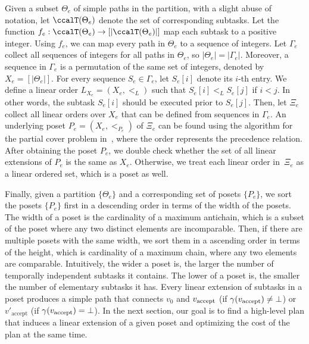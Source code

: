 \documentclass[Afour,sageh,times]{sagej}
\newcommand{\vertex}[1]{v_{\textup{#1}}}
\begin{document}
Given a subset $\Theta_e$ of simple paths in the partition, with a slight abuse of notation, let $\ccalT(\Theta_e)$ denote the set of corresponding  subtasks. Let the function $f_e:\ccalT(\Theta_e)\to [|\ccalT(\Theta_e)|]$ map each subtask to a positive integer. Using $f_e$, we can map every path in $\Theta_e$ to a sequence of integers. Let $\Gamma_e$ collect all sequences of integers for all paths in $\Theta_e$, so $|\Theta_e| =  |\Gamma_e|$. Moreover, a sequence in $\Gamma_e$ is a permutation of the same set of integers, denoted by $X_e = [|\Theta_e|]$. For every sequence $S_e \in \Gamma_e$, let $S_e[i]$ denote its $i$-th entry. We define a linear order $L_{X_e} = (X_e, <_L)$ such that  $S_e[i]  <_L  S_e[j] $ if $i  <  j$. In other words, the subtask $S_e[i]$ should be executed prior to  $S_e[j]$. Then, let $\Xi_e$ collect all linear orders over $X_e$ that can be defined from sequences in $\Gamma_e$. An underlying poset $P_e  = (X_e, <_{P_e})$ of $\Xi_e$ can be found using the algorithm for the partial cover problem in~\cite{heath2013poset}, where the order represents the precedence relation. After obtaining the poset $P_e$, we double check whether the set of all linear extensions of $P_e$ is the same as $X_e$. Otherwise, we treat each linear order in~$\Xi_e$ as a linear ordered set, which is a poset as well.

{Finally, given a partition $\{\Theta_e\}$ and a corresponding set of posets $\{P_e\}$, we sort the posets  $\{P_e\}$ first in a descending order in terms of the width of the posets. The width of a poset  is the cardinality of a maximum antichain, which is a subset of the poset where any two distinct elements are incomparable. Then, if there are multiple posets with the same width, we sort them in a ascending order in terms of the height, which is cardinality of a maximum chain, where any two elements are comparable. Intuitively, the wider a poset is, the larger the number of temporally independent subtasks it contains. The lower of a poset is, the smaller the number of elementary subtasks it has.} Every linear extension of subtasks in a poset produces a simple path that connects $v_0$ and $\vertex{accept}$ (if $\gamma(\vertex{accept}) \neq \bot$) or $v'_{\text{accept}}$ (if $\gamma(\vertex{accept}) = \bot$). In the next section, our goal is to find a high-level plan that induces a linear extension of a given poset and optimizing the cost of the plan at the same time.
\end{document}
